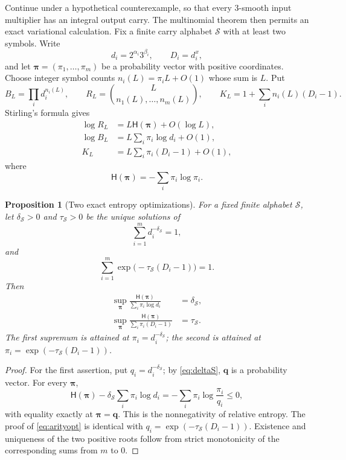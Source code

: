 \documentclass[11pt,oneside]{article}
\newtheorem{proposition}[theorem]{Proposition}
\theoremstyle{definition}
\begin{document}
Continue under a hypothetical counterexample, so that every $3$-smooth input multiplier has an integral output carry.  The multinomial theorem then permits an exact variational calculation.  Fix a finite carry alphabet $\mathcal S$ with at least two symbols.  Write
\[
       d_i=2^{\alpha_i}3^{\beta_i},
       \qquad D_i=d_i^x,
\]
and let $\boldsymbol\pi=(\pi_1,\ldots,\pi_m)$ be a probability vector with positive coordinates.  Choose integer symbol counts
$n_i(L)=\pi_iL+O(1)$ whose sum is $L$.  Put
\[
  B_L=\prod_i d_i^{n_i(L)},
  \qquad
  R_L=\binom{L}{n_1(L),\ldots,n_m(L)},
  \qquad
  K_L=1+\sum_i n_i(L)(D_i-1).
\]
Stirling's formula gives
\begin{align}
 \log R_L&=L\mathsf H(\boldsymbol\pi)+O(\log L),\label{eq:multientropy}\\
 \log B_L&=L\sum_i\pi_i\log d_i+O(1),\label{eq:multicost}\\
 K_L&=L\sum_i\pi_i(D_i-1)+O(1),\label{eq:multiarity}
\end{align}
where
\[
       \mathsf H(\boldsymbol\pi)=-\sum_i\pi_i\log\pi_i.
\]

\begin{proposition}[Two exact entropy optimizations]\label{prop:entropyoptimization}
For a fixed finite alphabet $\mathcal S$, let $\delta_{\mathcal S}>0$ and
$\tau_{\mathcal S}>0$ be the unique solutions of
\begin{equation}\label{eq:deltaS}
       \sum_{i=1}^m d_i^{-\delta_{\mathcal S}}=1,
\end{equation}
and
\begin{equation}\label{eq:tauS}
       \sum_{i=1}^m
          \exp\!\bigl(-\tau_{\mathcal S}(D_i-1)\bigr)=1.
\end{equation}
Then
\begin{align}
 \sup_{\boldsymbol\pi}
 \frac{\mathsf H(\boldsymbol\pi)}{\sum_i\pi_i\log d_i}
 &=\delta_{\mathcal S},\label{eq:ambientopt}\\
 \sup_{\boldsymbol\pi}
 \frac{\mathsf H(\boldsymbol\pi)}{\sum_i\pi_i(D_i-1)}
 &=\tau_{\mathcal S}.\label{eq:arityopt}
\end{align}
The first supremum is attained at
$\pi_i=d_i^{-\delta_{\mathcal S}}$; the second is attained at
$\pi_i=\exp(-\tau_{\mathcal S}(D_i-1))$.
\end{proposition}

\begin{proof}
For the first assertion, put $q_i=d_i^{-\delta_{\mathcal S}}$; by
\eqref{eq:deltaS}, $\boldsymbol q$ is a probability vector.  For every
$\boldsymbol\pi$,
\[
 \mathsf H(\boldsymbol\pi)
 -\delta_{\mathcal S}\sum_i\pi_i\log d_i
 =-\sum_i\pi_i\log\frac{\pi_i}{q_i}\le0,
\]
with equality exactly at $\boldsymbol\pi=\boldsymbol q$.  This is the nonnegativity of relative entropy.  The proof of \eqref{eq:arityopt} is identical with
$q_i=\exp(-\tau_{\mathcal S}(D_i-1))$.  Existence and uniqueness of the two positive roots follow from strict monotonicity of the corresponding sums from $m$ to $0$.
\end{proof}
\end{document}
